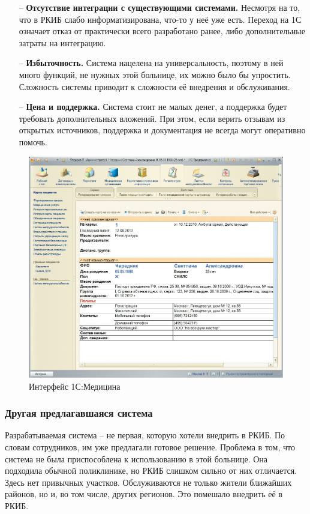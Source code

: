 \documentclass[a4paper,article]{article}
\begin{document}
\begin{sloppypar}
        \begin{itemize}[nolistsep]
            \item[--] \textbf{Отсутствие интеграции с существующими системами.} Несмотря на то, что в РКИБ слабо информатизирована, что-то у неё уже есть. Переход на 1С означает отказ от практически всего разработано ранее, либо дополнительные затраты на интеграцию.
            \item[--] \textbf{Избыточность.} Система нацелена на универсальность, поэтому в ней много функций, не нужных этой больнице, их можно было бы упростить. Сложность системы приводит к сложности её внедрения и обслуживания.
            \item[--] \textbf{Цена и поддержка.} Система стоит не малых денег, а поддержка будет требовать дополнительных вложений. При этом, если верить отзывам из открытых источников, поддержка и документация не всегда могут оперативно помочь.
        \end{itemize}

        \begin{figure}[h]

            \centering

            \includegraphics[width=0.6\linewidth]{Интерфейс 1С:Медицина.png}

            \caption{\centering Интерфейс 1С:Медицина}

            \label{fig:Интерфейс 1С:Медицина}

        \end{figure}

    \subsubsection{Другая предлагавшаяся система}

        Разрабатываемая система -- не первая, которую хотели внедрить в РКИБ. По словам сотрудников, им уже предлагали готовое решение. Проблема в том, что система не была приспособлена к использованию в этой больнице. Она подходила обычной поликлинике, но РКИБ слишком сильно от них отличается. Здесь нет привычных участков. Обслуживаются не только жители ближайших районов, но и, во том числе, других регионов. Это помешало внедрить её в РКИБ.


\end{sloppypar}
\end{document}
